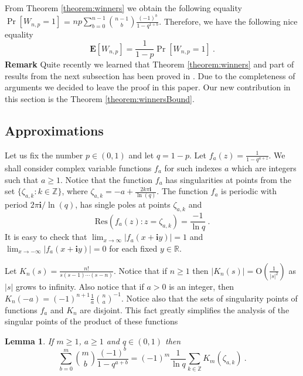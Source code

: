 \documentclass[proceedings]{dmtcs}
\newtheorem{lemma}{Lemma}
\newcommand{\ZZ}{\mathbb{Z}}
\newcommand{\RR}{\mathbb{R}}
\newcommand{\E}[1]{\mathbf{E}\left[#1\right]}
\newcommand{\Res}[3]{\mathrm{Res}(#1:#2=#3)}
\newcommand{\BigO}[1]{\mathrm{O}\left(#1\right)}
\begin{document}
From Theorem \ref{theorem:winners} we obtain the following equality $\Pr[W_{n,p}=1]$ = $n p  \sum_{b=0}^{n-1} \binom{n-1}{b} \frac{(-1)^b}{1-q^{1+b}}$.
Therefore, we have the following nice equality
$$
\E{W_{n,p}} = \frac{1}{1-p}\Pr[W_{n,p}=1] ~.
$$ 
\textbf{Remark} Quite recently we learned that Theorem \ref{theorem:winners} and part of results from the next subsection has been proved in \cite{kirschenhofer1996}. 
Due to the completeness of arguments we decided to leave the proof in this paper. 
Our new contribution in this section is the  Theorem \ref{theorem:winnersBound}.

\subsection{Approximations}

Let us fix the number $p\in(0,1)$ and let $q = 1-p$.
Let $f_a(z) = \frac{1}{1-q^{a+z}}$. We shall consider complex variable functions $f_a$ for such indexes $a$ 
which are integers such that $a\geq 1$.
Notice that the function $f_a$ has singularities at points from the set $\{\zeta_{a,k} : k\in\ZZ\}$,
where $\zeta_{a,k} = -a + \frac{2 k \pi \mathbf{i}}{\ln(q)}$. 
The function $f_a$ is periodic with period $2\pi\mathbf{i}/\ln(q)$,
has single poles at points $\zeta_{a,k}$ and
$$
  \Res{f_a(z)}{z}{\zeta_{a,k}} = \frac{-1}{\ln q} ~.
$$
It is easy to check  that $\lim_{x\to\infty} |f_a(x + \mathbf{i}y)| = 1$ and
$\lim_{x\to-\infty} |f_a(x + \mathbf{i}y)| = 0$ for each fixed $y \in \RR$.

Let $K_n(s) = \frac{n!}{s(s-1)\cdots(s-n)}$. Notice that if $n \geq 1$ then $|K_n(s)| = \BigO{\frac{1}{|s|^2}}$ 
as $|s|$ grows to infinity.  Also notice that if $a>0$ is an integer, then 
$K_n(-a) =  (-1)^{n+1} \frac{1}{a} \binom{n}{a}^{-1}$.
Notice also that the sets of singularity points of functions $f_a$ and $K_n$ are disjoint.
This fact greatly simplifies the analysis of the singular points of the product of these functions

\begin{lemma} 
\label{lemma:afterRice}
If $m\geq 1$, $a\geq 1$ and $q \in (0,1)$ then
$$
  \sum_{b=0}^{m} \binom{m}{b} \frac{(-1)^b}{1- q^{a+b}} = (-1)^{m} \frac{1}{\ln q} \sum_{k\in\ZZ} K_m(\zeta_{a,k})~.
$$
\end{lemma} 
\end{document}
